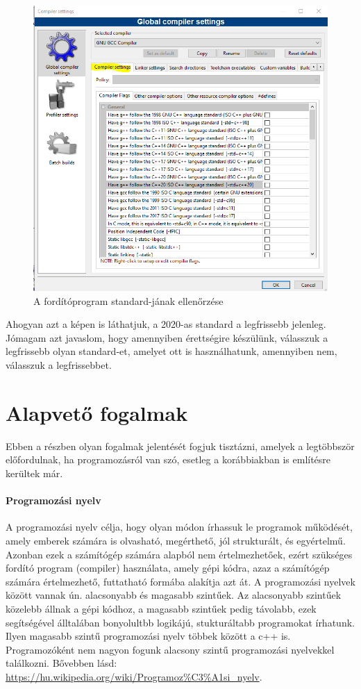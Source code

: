 \begin{figure}[H]
	\centering
	\includegraphics[width=1.0\linewidth]{images/bevezetes/check_compiler_03}
	\caption{A fordítóprogram standard-jának ellenőrzése}
	\label{fig:choose}
\end{figure}

Ahogyan azt a képen is láthatjuk, a 2020-as standard a legfrissebb jelenleg. Jómagam azt javaslom, hogy amennyiben érettségire készülünk, válasszuk a legfrissebb olyan standard-et, amelyet ott is használhatunk, amennyiben nem, válasszuk a legfrissebbet.

\section{Alapvető fogalmak}

Ebben a részben olyan fogalmak jelentését fogjuk tisztázni, amelyek a legtöbbször előfordulnak, ha programozásról van szó, esetleg a korábbiakban is említésre kerültek már.

\paragraph{Programozási nyelv}
A programozási nyelv célja, hogy olyan módon írhassuk le programok működését, amely emberek számára is olvasható, megérthető, jól strukturált, és egyértelmű. Azonban ezek a számítógép számára alapból nem értelmezhetőek, ezért szükséges fordító program (compiler) használata, amely gépi kódra, azaz a számítógép számára értelmezhető, futtatható formába alakítja azt át. A programozási nyelvek között vannak ún. alacsonyabb és magasabb szintűek. Az alacsonyabb szintűek közelebb állnak a gépi kódhoz, a magasabb szintűek pedig távolabb, ezek segítségével álltalában bonyolultbb logikájú, stukturáltabb programokat írhatunk. Ilyen magasabb szintű programozási nyelv többek között a c++ is. Programozóként nem nagyon fogunk alacsony szintű programozási nyelvekkel találkozni. Bővebben lásd: \url{https://hu.wikipedia.org/wiki/Programoz%C3%A1si_nyelv}.

